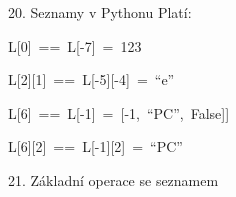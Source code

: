 \documentclass[czech]{beamer}
\newenvironment{lyxcode}
  {\par\begin{list}{}{
    \setlength{\rightmargin}{\leftmargin}
    \setlength{\listparindent}{0pt}%
    \raggedright
    \setlength{\itemsep}{0pt}
    \setlength{\parsep}{0pt}
    \normalfont\ttfamily}%
   \def\{{\char`\{}
   \def\}{\char`\}}
   \def\textasciitilde{\char`\~}
   \item[]}
  {\end{list}}
\begin{document}
\begin{frame}{20. Seznamy v Pythonu}
{\scriptsize Platí:}{\scriptsize\par}
\begin{lyxcode}
{\scriptsize L{[}0{]}~==~L{[}-7{]}~=~123}{\scriptsize\par}

{\scriptsize L{[}2{]}{[}1{]}~==~L{[}-5{]}{[}-4{]}~=~``e''}{\scriptsize\par}

{\scriptsize L{[}6{]}~==~L{[}-1{]}~=~{[}-1,~``PC'',~False{]}{]}}{\scriptsize\par}

{\scriptsize L{[}6{]}{[}2{]}~==~L{[}-1{]}{[}2{]}~=~``PC''}{\scriptsize\par}
\end{lyxcode}
\end{frame}

\begin{frame}[plain]{21. Základní operace se seznamem}


\end{frame}
\end{document}
